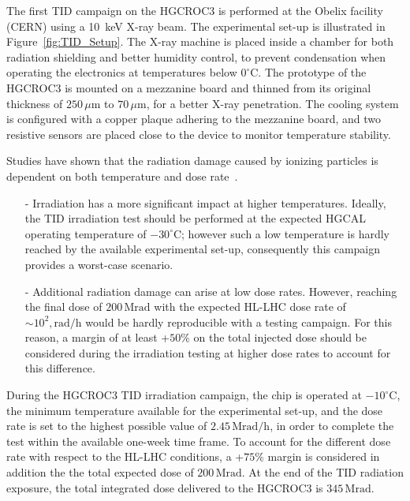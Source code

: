\bigbreak

The first TID campaign on the HGCROC3 is performed at the Obelix facility (CERN) using a 10~keV X-ray beam. The experimental set-up is illustrated in Figure~\ref{fig:TID_Setup}.
The X-ray machine is placed inside a chamber for both radiation shielding and better humidity control, to prevent condensation when operating the electronics at temperatures below $0^{\circ}$C. 
The prototype of the HGCROC3 is mounted on a mezzanine board and thinned from its original thickness of $250\,\mu\textrm{m}$ to $70\,\mu\textrm{m}$, for a better X-ray penetration.
The cooling system is configured with a copper plaque adhering to the mezzanine board, and two resistive sensors are placed close to the device to monitor temperature stability.

\bigbreak

Studies have shown that the radiation damage caused by ionizing particles is dependent on both temperature and dose rate~\cite{giulio}.
\begin{itemize}
    \item [-] Irradiation has a more significant impact at higher temperatures.  Ideally, the TID irradiation test should be performed at the expected HGCAL operating temperature of $-30^{\circ}$C; however such a low temperature is hardly reached by the available experimental set-up, consequently this campaign provides a worst-case scenario. 
    \item [-]  Additional radiation damage can arise at low dose rates. However, reaching the final dose of $200\,\textrm{Mrad}$ with the expected HL-LHC dose rate of $\sim10^2,\textrm{rad/h}$ would be hardly reproducible with a testing campaign. For this reason, a margin of at least +$50\%$ on the total injected dose should be considered during the irradiation testing at higher dose rates to account for this difference. 
\end{itemize}

During the HGCROC3 TID irradiation campaign, the chip is operated at $-10^{\circ}$C, the minimum temperature available for the experimental set-up, and the dose rate is set to the highest possible value of $2.45\,\textrm{Mrad/h}$, in order to complete the test within the available one-week time frame. 
To account for the different dose rate with respect to the HL-LHC conditions, a +$75\%$ margin is considered in addition the the total expected dose of $200\,\textrm{Mrad}$.
At the end of the TID radiation exposure, the total integrated dose delivered to the HGCROC3 is $345\,\textrm{Mrad}$.

